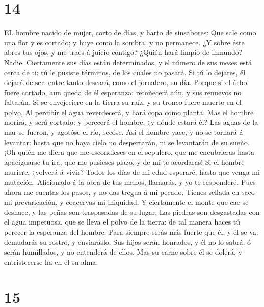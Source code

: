 \hypertarget{section-13}{%
\section{14}\label{section-13}}

 EL hombre nacido de mujer, corto de días, y harto de
sinsabores:  Que sale como una flor y es cortado; y huye
como la sombra, y no permanece.  ¿Y sobre éste abres tus
ojos, y me traes á juicio contigo?  ¿Quién hará limpio de
inmundo? Nadie.  Ciertamente sus días están determinados,
y el número de sus meses está cerca de ti: tú le pusiste términos, de
los cuales no pasará.  Si tú lo dejares, él dejará de ser:
entre tanto deseará, como el jornalero, su día.  Porque si
el árbol fuere cortado, aun queda de él esperanza; retoñecerá aún, y sus
renuevos no faltarán.  Si se envejeciere en la tierra su
raíz, y su tronco fuere muerto en el polvo,  Al percibir
el agua reverdecerá, y hará copa como planta.  Mas el
hombre morirá, y será cortado; y perecerá el hombre, ¿y dónde estará él?
 Las aguas de la mar se fueron, y agotóse el río, secóse.
 Así el hombre yace, y no se tornará á levantar: hasta
que no haya cielo no despertarán, ni se levantarán de su sueño.
 ¡Oh quién me diera que me escondieses en el sepulcro,
que me encubrieras hasta apaciguarse tu ira, que me pusieses plazo, y de
mí te acordaras!  Si el hombre muriere, ¿volverá á vivir?
Todos los días de mi edad esperaré, hasta que venga mi mutación.
 Aficionado á la obra de tus manos, llamarás, y yo te
responderé.  Pues ahora me cuentas los pasos, y no das
tregua á mi pecado.  Tienes sellada en saco mi
prevaricación, y coacervas mi iniquidad.  Y ciertamente
el monte que cae se deshace, y las peñas son traspasadas de su lugar;
 Las piedras son desgastadas con el agua impetuosa, que
se lleva el polvo de la tierra: de tal manera haces tú perecer la
esperanza del hombre.  Para siempre serás más fuerte que
él, y él se va; demudarás su rostro, y enviaráslo.  Sus
hijos serán honrados, y él no lo sabrá; ó serán humillados, y no
entenderá de ellos.  Mas su carne sobre él se dolerá, y
entristecerse ha en él su alma.

\hypertarget{section-14}{%
\section{15}\label{section-14}}

